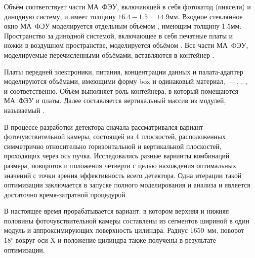 Объём  соответствует части МА~ФЭУ, включающей в себя фотокатод (пиксели) и динодную систему, и имеет толщину $16.4-1.5=14.9$мм. Входное стеклянное окно МА~ФЭУ моделируется отдельным объёмом , имеющим толщину 1.5мм. Пространство за динодной системой, включающее в себя печатные платы и ножки в воздушном пространстве, моделируется объёмом . Все части МА~ФЭУ, моделируемые перечисленными объёмами, вставляются в контейнер .

Платы передней электроники, питания, концентрации данных и палата-адаптер моделируются объёмами, имеющими форму box и одинаковый материал, --- , , , и  соответственно. Объём  выполняет роль контейнера, в который помещаются МА~ФЭУ и платы. Далее составляется вертикальный массив из  модулей, называемый .

В процессе разработки детектора сначала рассматривался вариант фоточувствительной камеры, состоящей из 4 плоскостей, расположенных симметрично относительно горизонтальной и вертикальной плоскостей, проходящих через ось пучка. Исследовались разные варианты комбинаций размера, поворотов и положения четверти с целью нахождения оптимальных значений с точки зрения эффективность всего детектора. Одна итерации такой оптимизации заключается в запуске полного моделирования и анализа и является достаточно время-затратной процедурой.

В настоящее время прорабатывается вариант, в котором верхняя и нижняя половины фоточувствительной камеры составлены из сегментов шириной в один модуль и аппроксимирующих поверхность цилиндра. Радиус 1650~мм, поворот 18$^\circ$ вокруг оси X и положение цилиндра также получены в результате оптимизации.

